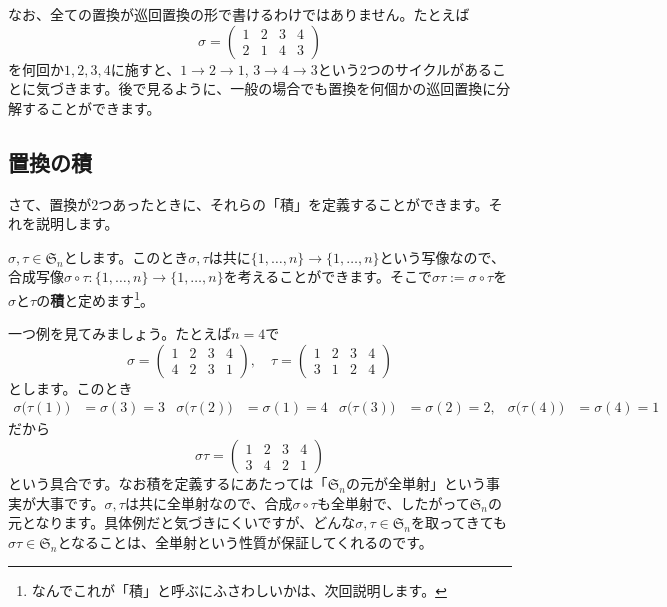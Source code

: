 なお、全ての置換が巡回置換の形で書けるわけではありません。たとえば
\[
\sigma = 
\begin{pmatrix}
1 & 2 & 3 & 4 \\
2 & 1 & 4 & 3
\end{pmatrix}
\]
を何回か$1, 2, 3, 4$に施すと、$1 \rightarrow 2 \rightarrow 1$, $3 \rightarrow 4 \rightarrow 3$という$2$つのサイクルがあることに気づきます。後で見るように、一般の場合でも置換を何個かの巡回置換に分解することができます。

\subsection{置換の積}

さて、置換が$2$つあったときに、それらの「積」を定義することができます。それを説明します。

$\sigma, \tau \in \mathfrak{S}_n$とします。このとき$\sigma, \tau$は共に$\{1, \ldots, n\}\rightarrow\{1, \ldots, n\}$という写像なので、合成写像$\sigma \circ \tau \colon \{1, \ldots, n\} \rightarrow \{1, \ldots, n\}$を考えることができます。そこで$\sigma\tau := \sigma \circ \tau$を$\sigma$と$\tau$の\textbf{積}と定めます\footnote{なんでこれが「積」と呼ぶにふさわしいかは、次回説明します。}。


一つ例を見てみましょう。たとえば$n = 4$で
\[
\sigma = 
\begin{pmatrix}
1 & 2 & 3 & 4 \\
4 & 2 & 3 & 1
\end{pmatrix}, \quad
\tau = 
\begin{pmatrix}
1 & 2 & 3 & 4 \\
3 & 1 & 2 & 4
\end{pmatrix}
\]
とします。このとき
\begin{align*}
\sigma\bigl(\tau(1)\bigr) &= \sigma(3) = 3 &\sigma\bigl(\tau(2)\bigr) &= \sigma(1) = 4 &\sigma\bigl(\tau(3)\bigr) &= \sigma(2) = 2,
&\sigma\bigl(\tau(4)\bigr) &= \sigma(4) = 1
\end{align*}
だから
\[
\sigma \tau =
\begin{pmatrix}
1 & 2 & 3 & 4 \\
3 & 4 & 2 & 1
\end{pmatrix}
\]
という具合です。なお積を定義するにあたっては「$\mathfrak{S}_n$の元が全単射」という事実が大事です。$\sigma, \tau$は共に全単射なので、合成$\sigma \circ \tau$も全単射で、したがって$\mathfrak{S}_n$の元となります。具体例だと気づきにくいですが、どんな$\sigma, \tau \in \mathfrak{S}_n$を取ってきても$\sigma\tau \in \mathfrak{S}_n$となることは、全単射という性質が保証してくれるのです。

